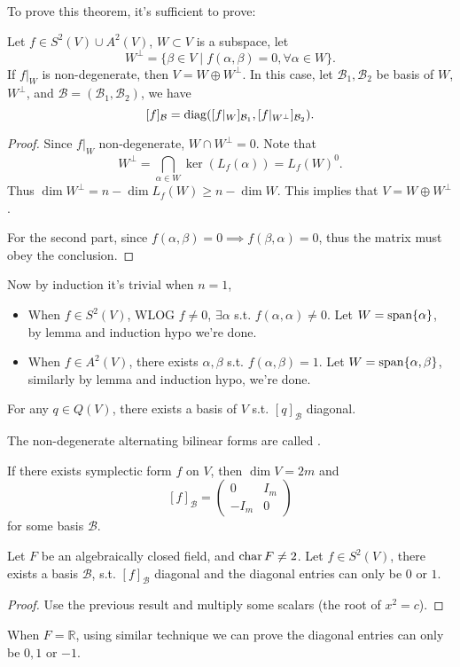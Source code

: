 To prove this theorem, it's sufficient to prove:
\begin{lemma}
	Let $f\in S^2(V)\cup A^2(V)$, $W \subset V$ is a subspace, let
	\[
	W^\perp = \{\beta\in V \mid f(\alpha, \beta) = 0, \forall \alpha\in W\}.
	\]
	If $f\big|_{W}$ is non-degenerate, then $V = W\oplus W^\perp$.
	In this case, let $\mathcal{B}_1, \mathcal{B}_2$ be basis of $W$, $W^\perp$,
	and  $\mathcal{B} = (\mathcal{B}_1, \mathcal{B}_2)$, we have
	\[
		[f]_{\mathcal{B}} = \operatorname{diag}([f|_W]_{\mathcal{B}_1},
		[f|_{W^\perp}]_{\mathcal{B}_2}).
	\]
\end{lemma}
\begin{proof}[Proof]
    Since $f\big|_W$ non-degenerate, $W\cap W^\perp = 0$.
	Note that
	\[
	W^\perp = \bigcap_{\alpha\in W}\ker(L_f(\alpha)) = L_f(W)^0.
	\]
	Thus $\dim W^\perp = n - \dim L_f(W) \ge n - \dim W$.
	This implies that  $V = W\oplus W^\perp$.

	For the second part, since  $f(\alpha, \beta) = 0\implies f(\beta, \alpha) = 0$,
	thus the matrix must obey the conclusion.
\end{proof}

Now by induction it's trivial when $n = 1$,
\begin{itemize}
	\item When $f\in S^2(V)$,
		WLOG $f\ne 0$, $\exists \alpha$ s.t. $f(\alpha, \alpha) \ne 0$.
		Let $W = \operatorname{span}\{\alpha\}$, by lemma and induction hypo we're done.
	\item When $f\in A^2(V)$, there exists $\alpha, \beta$
		s.t. $f(\alpha, \beta) =1$. Let $W = \operatorname{span}\{\alpha, \beta\}$,
		similarly by lemma and induction hypo, we're done.
\end{itemize}

\begin{corollary}
	For any $q\in Q(V)$,
	there exists a basis of $V$ s.t. $[q]_{\mathcal{B}}$ diagonal.
\end{corollary}

The non-degenerate alternating bilinear forms are called .
\begin{corollary}
    If there exists symplectic form $f$ on $V$, then $\dim V = 2m$ and
	\[
		[f]_{\mathcal{B}} = \begin{pmatrix}
			0&I_m \\ -I_m&0
		\end{pmatrix}
	\]
	for some basis $\mathcal{B}$.
\end{corollary}

\begin{theorem}
    Let $F$ be an algebraically closed field, and $\operatorname{char} F \ne 2$.
	Let $f\in S^2(V)$, there exists a basis $\mathcal{B}$, s.t. $[f]_{\mathcal{B}}$ 
	diagonal and the diagonal entries can only be $0$ or $1$.
\end{theorem}
\begin{proof}[Proof]
    Use the previous result and multiply some scalars (the root of $x^2 = c$).
\end{proof}

When $F = \mathbb{R}$, using similar technique we can prove the
diagonal entries can only be $0, 1$ or $-1$.
